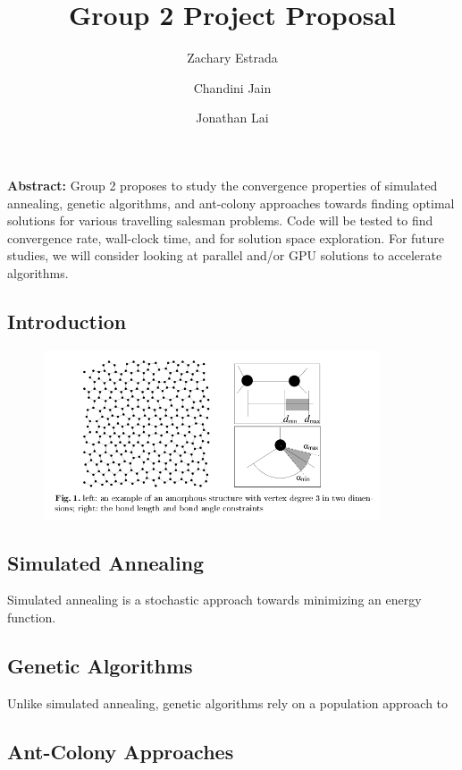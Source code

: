 \documentclass[12pt,onecolumn,notitlepage]{article}
\title{Group 2 Project Proposal}
\author{Zachary Estrada \and Chandini Jain \and Jonathan Lai}
\begin{document}
\maketitle


\textbf{Abstract:} Group 2 proposes to study the convergence
properties of simulated annealing, genetic algorithms, and ant-colony approaches towards
finding optimal solutions for various travelling salesman problems.  Code will be tested
to find convergence rate, wall-clock time, and for solution space exploration.  For future studies,
we will consider looking at parallel and/or GPU solutions to accelerate algorithms.

\subsection{Introduction}


\begin{figure}
\centering
\includegraphics[width=10cm,height=5cm]{Figures/amorphousSilicon.png}
\label{fig:amorphousSilicon}
\end{figure}

\subsection{Simulated Annealing}
Simulated annealing is a stochastic approach towards minimizing an energy function.

\subsection{Genetic Algorithms}
Unlike simulated annealing, genetic algorithms rely on a population approach to 

\subsection{Ant-Colony Approaches}
\end{document}
